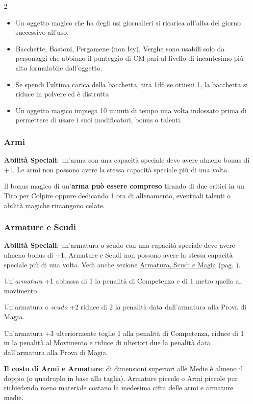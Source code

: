 \begin{multicols}{2}
\begin{itemize}[leftmargin=*]
\item
Un oggetto magico che ha degli usi giornalieri si ricarica all'alba del giorno successivo all'uso.
\item
Bacchette, Bastoni, Pergamene (non Isy), Verghe sono usabili solo da personaggi che abbiano il punteggio di CM pari al livello di incantesimo più alto formulabile dall'oggetto.
\item
Se spendi l'ultima carica della bacchetta, tira 1d6 se ottieni 1, la bacchetta si riduce in polvere ed è distrutta
\item
Un oggetto magico impiega 10 minuti di tempo una volta indossato prima di permettere di usare i suoi modificatori, bonus o talenti.

\end{itemize}

\subsubsection{Armi}

\textbf{Abilità Speciali}: un'arma con una capacità speciale deve avere almeno bonus di +1. Le armi non possono avere la stessa capacità speciale più di una volta.

Il bonus magico di un'\textbf{arma può essere compreso} tirando di due critici in un Tiro per Colpire oppure dedicando 1 ora di allenamento, eventuali talenti o abilità magiche rimangono celate.

\subsubsection{Armature e Scudi}

\textbf{Abilità Speciali}: un'armatura o scudo con una capacità speciale deve avere almeno bonus di +1. Armature e Scudi non possono avere la stessa capacità speciale più di una volta. Vedi anche sezione \hyperlink{armaturaescudimagici}{Armatura, Scudi e Magia} (pag. \pageref{armaturaescudimagici}).

Un'\emph{armatura} +1 abbassa di 1 la penalità di Competenza e di 1 metro quella al movimento

Un'armatura o \emph{scudo} +2 riduce di 2 la penalità data dall'armatura alla Prova di Magia.

Un'armatura +3 ulteriormente toglie 1 alla penalità di Competenza, riduce di 1 m la penalità al Movimento e riduce di ulteriori due la penalità data dall'armatura alla Prova di Magia.

\textbf{Il costo di Armi e Armature}: di dimensioni superiori alle Medie è almeno il doppio (o quadruplo in base alla taglia). Armature piccole o Armi piccole pur richiedendo meno materiale costano la medesima cifra delle armi e armature medie.


\end{multicols}
